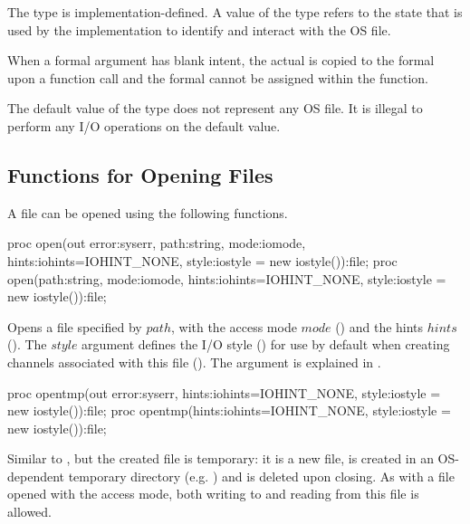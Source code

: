 The  type is implementation-defined.
A value of the  type refers to the state that is used
by the implementation to identify and interact with the OS file.

When a  formal argument has blank intent, the
actual is copied to the formal upon a function call and
the formal cannot be assigned within the function.

The default value of the  type does not represent any OS file.
It is illegal to perform any I/O operations on the default value.


\subsection{Functions for Opening Files}
\label{IO_open_file}

A file can be opened using the following functions.

\begin{protohead}
proc open(out error:syserr, path:string, mode:iomode,
          hints:iohints=IOHINT_NONE, style:iostyle = new iostyle()):file;
proc open(path:string, mode:iomode,
          hints:iohints=IOHINT_NONE, style:iostyle = new iostyle()):file;
\end{protohead}
\begin{protobody}
Opens a file specified by $path$, with
the access mode $mode$ ()
and the hints $hints$ ().
The $style$ argument defines the I/O style ()
for use by default when creating channels associated with this file
().
The  argument is explained in .
\end{protobody}

\begin{protohead}
proc opentmp(out error:syserr,
             hints:iohints=IOHINT_NONE, style:iostyle = new iostyle()):file;
proc opentmp(hints:iohints=IOHINT_NONE, style:iostyle = new iostyle()):file;
\end{protohead}
\begin{protobody}
Similar to , but the created file is temporary:
it is a new file, is created in an OS-dependent temporary directory (e.g. )
and is deleted upon closing.
As with a file opened with the  access mode,
both writing to and reading from this file is allowed.
\end{protobody}

